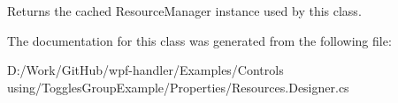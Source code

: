 Returns the cached Resource\+Manager instance used by this class. 



The documentation for this class was generated from the following file\+:\begin{DoxyCompactItemize}
\item 
D\+:/\+Work/\+Git\+Hub/wpf-\/handler/\+Examples/\+Controls using/\+Toggles\+Group\+Example/\+Properties/Resources.\+Designer.\+cs\end{DoxyCompactItemize}
